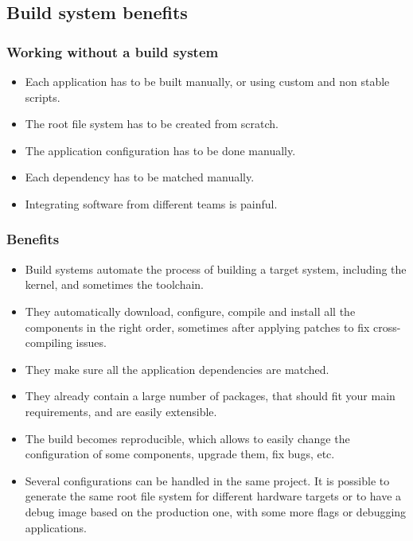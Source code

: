 \subsection{Build system benefits}

\begin{frame}
  \frametitle{Working without a build system}
  \begin{itemize}
    \item Each application has to be built manually, or using custom
          and non stable scripts.
    \item The root file system has to be created from scratch.
    \item The application configuration has to be done manually.
    \item Each dependency has to be matched manually.
    \item Integrating software from different teams is painful.
  \end{itemize}
\end{frame}

\begin{frame}
  \frametitle{Benefits}
  \begin{itemize}
    \item Build systems automate the process of building a target
      system, including the kernel, and sometimes the toolchain.
    \item They automatically download, configure, compile and install
      all the components in the right order, sometimes after applying
      patches to fix cross-compiling issues.
    \item They make sure all the application dependencies are matched.
    \item They already contain a large number of packages, that should
      fit your main requirements, and are easily extensible.
    \item The build becomes reproducible, which allows to easily
      change the configuration of some components, upgrade them, fix
      bugs, etc.
    \item Several configurations can be handled in the same project.
      It is possible to generate the same root file system for
      different hardware targets or to have a debug image based on the
      production one, with some more flags or debugging applications.
  \end{itemize}
\end{frame}

